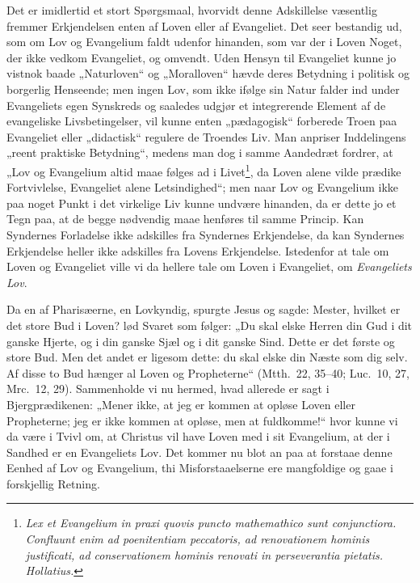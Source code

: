 \documentclass[12pt]{book}
\begin{document}
Det er imidlertid et stort Spørgsmaal, hvorvidt denne Adskillelse
væsentlig fremmer Erkjendelsen enten af Loven eller af Evangeliet.
Det seer bestandig ud, som om Lov og Evangelium faldt udenfor
hinanden, som var der i Loven Noget, der ikke vedkom Evangeliet, og
omvendt. Uden Hensyn til Evangeliet kunne jo vistnok baade
„Naturloven“ og „Moralloven“ hævde deres Betydning i politisk og
borgerlig Henseende; men ingen Lov, som ikke ifølge sin Natur falder
ind under Evangeliets egen Synskreds og saaledes udgjør et
integrerende Element af de evangeliske Livsbetingelser, vil kunne
enten „pædagogisk“ forberede Troen paa Evangeliet eller
„didactisk“ regulere de Troendes Liv. Man anpriser Inddelingens
„reent praktiske Betydning“, medens man dog i samme Aandedræt
fordrer, at „Lov og Evangelium altid maae følges ad i
Livet\footnote{\textit{Lex et Evangelium in praxi quovis puncto
mathemathico sunt conjunctiora. Confluunt enim ad poenitentiam
peccatoris, ad renovationem hominis justificati, ad conservationem
hominis renovati in perseverantia pietatis. Hollatius.}}, da Loven
alene vilde prædike Fortvivlelse, Evangeliet alene Letsindighed“;
men naar Lov og Evangelium ikke paa noget Punkt i det virkelige Liv
kunne undvære hinanden, da er dette jo et Tegn paa, at de begge
nødvendig maae henføres til samme Princip. Kan Syndernes Forladelse
ikke adskilles fra Syndernes Erkjendelse, da kan Syndernes
Erkjendelse heller ikke adskilles fra Lovens Erkjendelse. Istedenfor
at tale om
Loven og Evangeliet ville vi da hellere tale om Loven i Evangeliet,
om \emph{Evangeliets Lov}.

Da en af Pharisæerne, en Lovkyndig, spurgte Jesus og sagde: Mester,
hvilket er det store Bud i Loven? lød Svaret som følger: „Du skal
elske Herren din Gud i dit ganske Hjerte, og i din ganske Sjæl og i
dit ganske Sind. Dette er det første og store Bud. Men det andet er
ligesom dette: du skal elske din Næste som dig selv. Af disse to Bud
hænger al Loven og Propheterne“ (Mtth.\ 22, 35--40; Luc.\ 10, 27,
Mrc.\ 12, 29). Sammenholde vi nu hermed, hvad allerede er sagt i
Bjergprædikenen: „Mener ikke, at jeg er kommen at opløse Loven eller
Propheterne; jeg er ikke kommen at opløse, men at fuldkomme!“ hvor
kunne vi da være i Tvivl om, at Christus vil have Loven med i sit
Evangelium, at der i Sandhed er en Evangeliets Lov. Det kommer nu
blot an paa at forstaae denne Eenhed af Lov og Evangelium, thi
Misforstaaelserne ere mangfoldige og gaae i forskjellig Retning.
\end{document}
